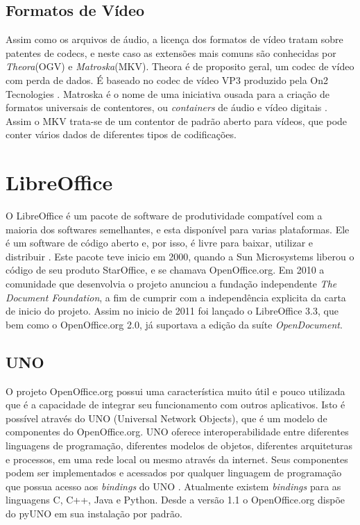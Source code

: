 \subsection{Formatos de Vídeo}
Assim como os arquivos de áudio, a licença dos formatos de vídeo tratam sobre patentes de codecs, e neste caso as extensões mais comuns são conhecidas por \textit{Theora}(OGV) e \textit{Matroska}(MKV).
Theora é de proposito geral, um codec de vídeo com perda de dados. É baseado no codec de vídeo VP3 produzido pela On2 Tecnologies \cite{XIPH.ORG FOUNDATION 2011}.
Matroska é o nome de uma iniciativa ousada para a criação de formatos universais de contentores, ou \textit{containers} de áudio e vídeo digitais \cite{WIKIPEDIA 2012}.
Assim o MKV trata-se de um contentor de padrão aberto para vídeos, que pode conter vários dados de diferentes tipos de codificações.

\section{LibreOffice}
O LibreOffice é um pacote de software de produtividade compatível com a maioria dos softwares semelhantes, e esta disponível para varias plataformas. Ele é um software de código aberto e, por isso, é livre para baixar, utilizar e distribuir \cite{Parker e Faile 2010}.
Este pacote teve inicio em 2000, quando a Sun Microsystems liberou o código de seu produto StarOffice, e se chamava OpenOffice.org. Em 2010 a comunidade que desenvolvia o projeto anunciou a fundação independente \textit{The Document Foundation}, a fim de cumprir com a independência explicita da carta de inicio do projeto. 
Assim no inicio de 2011 foi lançado o LibreOffice 3.3, que bem como o OpenOffice.org 2.0, já suportava a edição da suíte \textit{OpenDocument}.

\subsection{UNO}
O projeto OpenOffice.org possui uma característica muito útil e pouco utilizada que é a capacidade de integrar seu funcionamento com outros aplicativos. Isto é possível através do UNO (Universal Network Objects), que é um modelo de componentes do OpenOffice.org. UNO oferece interoperabilidade entre diferentes linguagens de programação, diferentes modelos de objetos, diferentes arquiteturas e processos, em uma rede local ou mesmo através da internet. Seus componentes podem ser implementados e acessados por qualquer linguagem de programação que possua acesso aos \textit{bindings} do UNO \cite{MINETTO  2012}.
Atualmente existem \textit{bindings} para as linguagens C, C++, Java e Python. Desde a versão 1.1 o OpenOffice.org dispõe do pyUNO em sua instalação por padrão.

